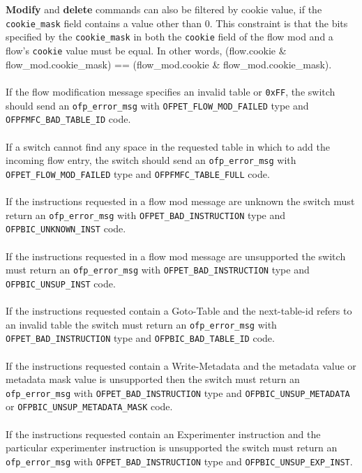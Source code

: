 \documentclass[10pt]{article}
\begin{document}
\\\\
\textbf{Modify} and \textbf{delete} commands can also be filtered by cookie value, if the \verb|cookie_mask| field contains a value other than 0. This constraint is that the bits specified by the \verb|cookie_mask| in both the \verb|cookie| field of the flow mod and a flow's \verb|cookie| value must be equal. In other words, (flow.cookie \& flow\_mod.cookie\_mask) == (flow\_mod.cookie \& flow\_mod.cookie\_mask).
\\\\
If the flow modification message specifies an invalid table or \verb|0xFF|, the switch should send an \verb|ofp_error_msg| with \verb|OFPET_FLOW_MOD_FAILED| type and \verb|OFPFMFC_BAD_TABLE_ID| code.
\\\\
If a switch cannot find any space in the requested table in which to add the incoming flow entry, the switch should send an \verb|ofp_error_msg| with \verb|OFPET_FLOW_MOD_FAILED| type and \verb|OFPFMFC_TABLE_FULL| code.
\\\\
If the instructions requested in a flow mod message are unknown the switch must return an \verb|ofp_error_msg| with \verb|OFPET_BAD_INSTRUCTION| type and \verb|OFPBIC_UNKNOWN_INST| code.
\\\\
If the instructions requested in a flow mod message are unsupported the switch must return an \verb|ofp_error_msg| with \verb|OFPET_BAD_INSTRUCTION| type and \verb|OFPBIC_UNSUP_INST| code.
\\\\
If the instructions requested contain a Goto-Table and the next-table-id refers to an invalid table the switch must return an \verb|ofp_error_msg| with \verb|OFPET_BAD_INSTRUCTION| type and \verb|OFPBIC_BAD_TABLE_ID| code.
\\\\
If the instructions requested contain a Write-Metadata and the metadata value or metadata mask value is unsupported then the switch must return an \verb|ofp_error_msg| with \verb|OFPET_BAD_INSTRUCTION| type and \verb|OFPBIC_UNSUP_METADATA| or \verb|OFPBIC_UNSUP_METADATA_MASK| code.
\\\\
If the instructions requested contain an Experimenter instruction and the particular experimenter instruction is unsupported the switch must return an \verb|ofp_error_msg| with \verb|OFPET_BAD_INSTRUCTION| type and \verb|OFPBIC_UNSUP_EXP_INST|.
\end{document}
